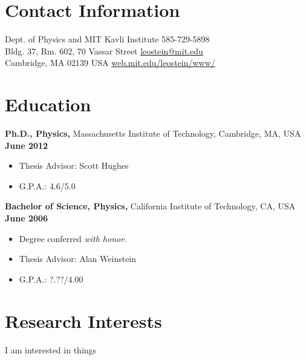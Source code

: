 \documentclass[margin,line]{res}
\begin{document}
\newcommand{\myname}{Leo C. Stein}
\newlength{\mynamewidth}
\settowidth{\mynamewidth}{\namefont\myname}

\name{\hspace*{0.5\textwidth}\hspace{-0.5\mynamewidth} \myname \vspace*{.1in}}

\begin{resume}
\section{\sc Contact Information}
\vspace{.05in}
Dept. of Physics and MIT Kavli Institute            \hfill 585-729-5898 \\
Bldg. 37, Rm. 602, 70 Vassar Street    \hfill \href{mailto:leostein@mit.edu}{leostein@mit.edu}\\
Cambridge, MA 02139 USA \hfill \href{http://web.mit.edu/leostein/www/}{web.mit.edu/leostein/www/}\\




\section{\sc Education}
{\bf Ph.D., Physics,} Massachusetts Institute of Technology, Cambridge, MA, USA \hfill {\bf June 2012}\\
\vspace*{-.1in}
\begin{itemize}
\item[ ] Thesis Advisor: Scott Hughes
\item[ ] G.P.A.: 4.6/5.0
\end{itemize}

{\bf Bachelor of Science, Physics,} California Institute of Technology, CA, USA \hfill {\bf June 2006}\\
\vspace*{-.1in}
\begin{itemize}
\item[ ] Degree conferred \emph{with honor}.
\item[ ] Thesis Advisor: Alan Weinstein
\item[ ] G.P.A.: ?.??/4.00
\end{itemize}

\section{\sc Research Interests}
I am interested in things


\end{resume}
\end{document}
